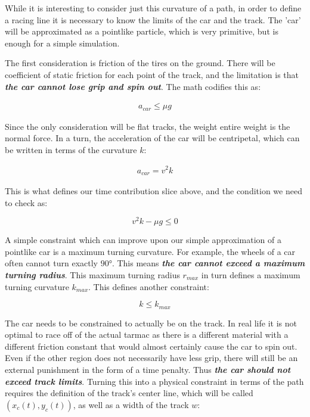 \documentclass[12pt,twocolumn]{article}
\begin{document}
While it is interesting to consider just this curvature of a path, in order to define a racing line it is necessary to know the limits of the car and the track. The 'car' will be approximated as a pointlike particle, which is very primitive, but is enough for a simple simulation.

The first consideration is friction of the tires on the ground. There will be coefficient of static friction for each point of the track, and the limitation is that \textit{\textbf{the car cannot lose grip and spin out}}. The math codifies this as:

\begin{align*}
  a_{car}\leq \mu g
\end{align*}

Since the only consideration will be flat tracks, the weight entire weight is the normal force. In a turn, the acceleration of the car will be centripetal, which can be written in terms of the curvature $k$:

\begin{align*}
  a_{car}=v^2k
\end{align*}

This is what defines our time contribution slice above, and the condition we need to check as:

\begin{equation}
  v^2k-\mu g\leq 0
\end{equation}

A simple constraint which can improve upon our simple approximation of a pointlike car is a maximum turning curvature. For example, the wheels of a car often cannot turn exactly $\ang{90}$. This means \textit{\textbf{the car cannot exceed a maximum turning radius}}. This maximum turning radius $r_{max}$ in turn defines a maximum turning curvature $k_{max}$. This defines another constraint:

\begin{equation}
  k\leq k_{max}
\end{equation}

The car needs to be constrained to actually be on the track. In real life it is not optimal to race off of the actual tarmac as there is a different material with a different friction constant that would almost certainly cause the car to spin out. Even if the other region does not necessarily have less grip, there will still be an external punishment in the form of a time penalty. Thus \textit{\textbf{the car should not exceed track limits}}. Turning this into a physical constraint in terms of the path requires the definition of the track's center line, which will be called $(x_c(t),y_c(t))$, as well as a width of the track $w$:
\end{document}
